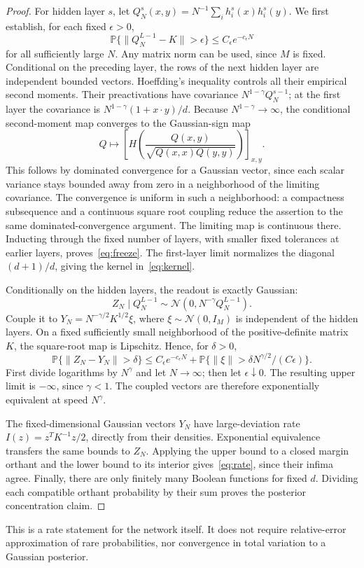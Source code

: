 \begin{proof}
For hidden layer $s$, let
$Q_N^s(x,y)=N^{-1}\sum_i h_i^s(x)h_i^s(y)$.
We first establish, for each fixed $\epsilon>0$,
\begin{equation}\label{eq:freeze}
 \mathbb P\{\|Q_N^{L-1}-K\|>\epsilon\}
       \le C_\epsilon e^{-c_\epsilon N}
\end{equation}
for all sufficiently large $N$. Any matrix norm can be used, since
$M$ is fixed. Conditional on the preceding layer, the rows of the
next hidden layer are independent bounded vectors. Hoeffding's
inequality controls all their empirical second moments. Their
preactivations have covariance $N^{1-\gamma}Q_N^{s-1}$; at the first
layer the covariance is
$N^{1-\gamma}(1+x\cdot y)/d$. Because $N^{1-\gamma}\to\infty$,
the conditional second-moment map converges to the Gaussian-sign map
\[
 Q\longmapsto \left[H\!\left(
 \frac{Q(x,y)}{\sqrt{Q(x,x)Q(y,y)}}\right)\right]_{x,y}.
\]
This follows by dominated convergence for a Gaussian vector, since
each scalar variance stays bounded away from zero in a neighborhood
of the limiting covariance. The convergence is uniform in such a
neighborhood: a compactness subsequence and a continuous square root
coupling reduce the assertion to the same dominated-convergence
argument. The limiting map is continuous there. Inducting through
the fixed number of layers, with smaller fixed tolerances at earlier
layers, proves~\eqref{eq:freeze}. The first-layer limit normalizes
the diagonal $(d+1)/d$, giving the kernel in~\eqref{eq:kernel}.

Conditionally on the hidden layers, the readout is exactly Gaussian:
\begin{equation}\label{eq:readout}
 Z_N\mid Q_N^{L-1}\sim\mathcal N(0,N^{-\gamma}Q_N^{L-1}).
\end{equation}
Couple it to $Y_N=N^{-\gamma/2}K^{1/2}\xi$, where
$\xi\sim\mathcal N(0,I_M)$ is independent of the hidden layers.
On a fixed sufficiently small neighborhood of the positive-definite
matrix $K$, the square-root map is Lipschitz. Hence, for $\delta>0$,
\[
 \mathbb P\{\|Z_N-Y_N\|>\delta\}
 \le C_\epsilon e^{-c_\epsilon N}
 +\mathbb P\{\|\xi\|>\delta N^{\gamma/2}/(C\epsilon)\}.
\]
First divide logarithms by $N^\gamma$ and let $N\to\infty$;
then let $\epsilon\downarrow0$. The resulting upper limit is
$-\infty$, since $\gamma<1$. The coupled vectors are therefore
exponentially equivalent at speed $N^\gamma$.

The fixed-dimensional Gaussian vectors $Y_N$ have large-deviation
rate $I(z)=z^TK^{-1}z/2$, directly from their densities. Exponential
equivalence transfers the same bounds to $Z_N$. Applying the upper
bound to a closed margin orthant and the lower bound to its interior
gives~\eqref{eq:rate}, since their infima agree. Finally, there are
only finitely many Boolean functions for fixed $d$. Dividing each
compatible orthant probability by their sum proves the posterior
concentration claim.
\end{proof}

This is a rate statement for the network itself. It does not require
relative-error approximation of rare probabilities, nor convergence
in total variation to a Gaussian posterior.

